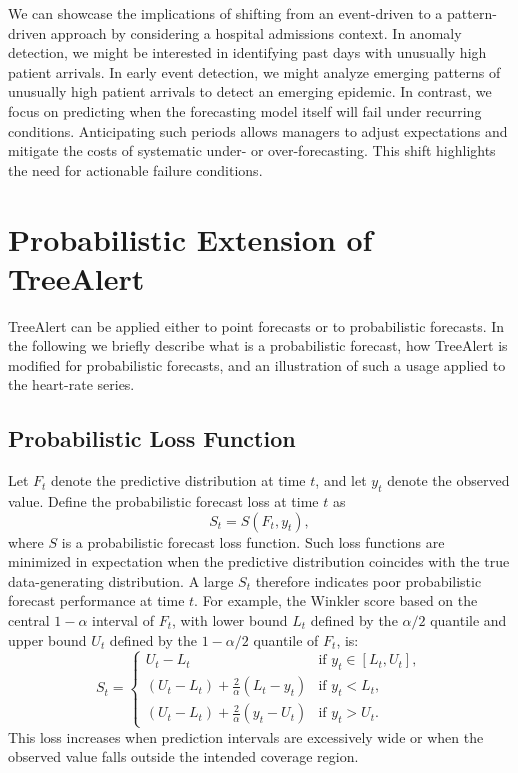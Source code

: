 \documentclass[12pt]{article}
\begin{document}
We can showcase the implications of shifting from an event-driven to a pattern-driven approach by considering a hospital admissions context.  In anomaly detection, we might be
interested in identifying past days with unusually high patient arrivals. %
In early event detection, we might analyze emerging patterns of unusually high patient arrivals to detect an emerging epidemic. In contrast, we focus on predicting when the forecasting model itself will fail under recurring conditions. Anticipating such periods allows managers to adjust expectations and mitigate the costs of systematic under- or over-forecasting. This shift highlights the need for actionable failure conditions.


\section{Probabilistic Extension of TreeAlert}
\label{app:probabilistic_treealert}
TreeAlert can be applied either to point forecasts or to probabilistic forecasts. In the following we briefly describe what is a probabilistic forecast, how TreeAlert is modified for probabilistic forecasts, and an illustration of such a usage applied to the heart-rate series.

\subsection{Probabilistic Loss Function}
Let $F_t$ denote the predictive distribution at time $t$, and let $y_t$ denote the observed value.
Define the probabilistic forecast loss at time $t$ as
\begin{equation}
S_t = S(F_t, y_t),
\end{equation}
where $S$ is a probabilistic forecast loss function. Such loss functions are minimized in expectation when the predictive distribution coincides with the true data-generating distribution. A large $S_t$ therefore indicates poor probabilistic forecast performance at time $t$. For example, the Winkler score based on the central $1-\alpha$ interval of $F_t$, with lower bound $L_t$ defined by the $\alpha/2$ quantile and upper bound $U_t$ defined by the $1-\alpha/2$ quantile of $F_t$, is:
\begin{equation}
S_t =
\begin{cases}
U_t - L_t 
& \text{if } y_t \in [L_t, U_t], \\[3pt]
(U_t - L_t) + \frac{2}{\alpha}(L_t - y_t) 
& \text{if } y_t < L_t, \\[3pt]
(U_t - L_t) + \frac{2}{\alpha}(y_t - U_t) 
& \text{if } y_t > U_t.
\end{cases}
\end{equation}
This loss increases when prediction intervals are excessively wide or 
when the observed value falls outside the intended coverage region.
\end{document}
